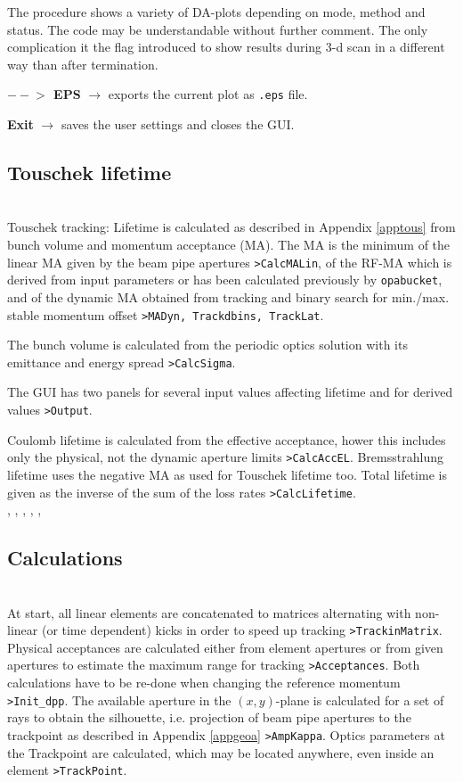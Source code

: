 \documentclass[12pt]{article}
\newcommand\code[1]{{\tt #1}}
\newcommand{\ofld}[1]{\colorbox{black!15}{{\bf #1}}}
\newcommand\guico[1]{{\color{blue}\code{#1}}}
\newcommand{\evcod}[2]{\ofld{#1} $\rightarrow$ \guico{#2}}
\newcommand{\opagui}[1]{\colorbox{blue!20}{{\color{black}\code{#1}}}}
\newcommand{\oguih}[2]{\subsection{\label{#2}#1}{\Huge\opagui{#2}}\\}
\newcommand{\opaguif}[1]{\colorbox{violet!30}{{\color{black}\code{#1}}}}
\newcommand{\oguif}[1]{\hyperref[#1]{\opaguif{#1}}}
\newcommand{\opauni}[1]{\colorbox{orange!30}{{\color{black}\code{#1}}}}
\newcommand{\ounih}[2]{\subsection{\label{#2}#1}{\Huge\opauni{#2}}\\}
\newcommand{\ouni}[1]{\hyperref[#1]{\opauni{#1}}}
\newcommand{\uses}[1]{\flushleft {\bf Uses:} #1}
\begin{document}
The \guico{MakePlot} procedure shows a variety of DA-plots depending on mode, method and status. The code may be understandable without further comment. The only complication it the flag \guico{MonitorXXP} introduced to show results during 3-d scan in a different way than after termination. 

\evcod{$--\!\!>$ EPS}{butExportClick} exports the current plot as \code{.eps} file.

\evcod{Exit}{Exit} saves the user settings and closes the GUI.





\oguih{Touschek lifetime}{opatracktt} 

Touschek tracking: Lifetime is calculated as described in Appendix \ref{apptous} from bunch volume and momentum acceptance (MA). The MA is the minimum of the linear MA given by the beam pipe apertures \code{>CalcMALin}, of the RF-MA which is derived from input parameters or has been calculated previously by {\tt opabucket}, and of the dynamic MA obtained from tracking and binary search for min./max. stable momentum offset \code{>MADyn, Trackdbins, TrackLat}.

The bunch volume is calculated from the periodic optics solution with its emittance and energy spread \code{>CalcSigma}.

The GUI has two panels for several input values affecting lifetime and for derived values \code{>Output}.

Coulomb lifetime is calculated from the effective acceptance, hower this includes only the physical, not the dynamic aperture limits \code{>CalcAccEL}. Bremsstrahlung lifetime uses the negative MA as used for Touschek lifetime too. Total lifetime is given as the inverse of the sum of the loss rates \code{>CalcLifetime}.\\



\uses{\ouni{tracklib}, \ouni{linoplib}, \ouni{globlib} \ouni{mathlib}, \oguif{../com/asfigure}, \oguif{../com/vgraph}, \ouni{../com/asaux}}


\ounih{Calculations}{tracklib}

At start, all linear elements are concatenated to matrices alternating with non-linear (or time dependent) kicks in order to speed up tracking \code{>TrackinMatrix}. Physical acceptances are calculated either from element apertures or from given apertures to estimate the maximum range for tracking \code{>Acceptances}. Both calculations have to be re-done when changing the reference momentum \code{>Init\_dpp}.
The available aperture in the $(x,y)$-plane is calculated for a set of rays to obtain the silhouette, i.e. projection of beam pipe apertures to the trackpoint as described in Appendix \ref{appgeoa} \code{>AmpKappa}. Optics parameters at the Trackpoint are calculated, which may be located anywhere, even inside an element \code{>TrackPoint}.
\end{document}
